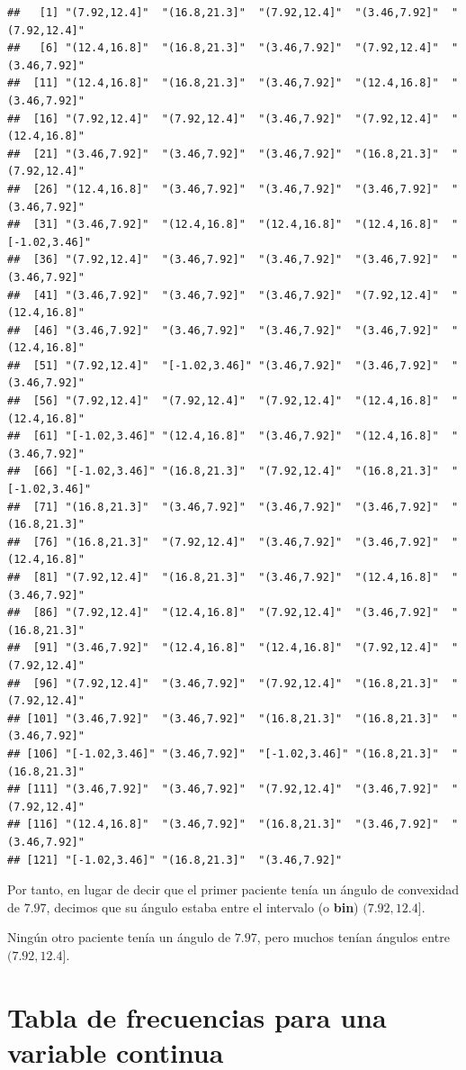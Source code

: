 \documentclass[
]{book}
\begin{document}
\begin{verbatim}
##   [1] "(7.92,12.4]"  "(16.8,21.3]"  "(7.92,12.4]"  "(3.46,7.92]"  "(7.92,12.4]" 
##   [6] "(12.4,16.8]"  "(16.8,21.3]"  "(3.46,7.92]"  "(7.92,12.4]"  "(3.46,7.92]" 
##  [11] "(12.4,16.8]"  "(16.8,21.3]"  "(3.46,7.92]"  "(12.4,16.8]"  "(3.46,7.92]" 
##  [16] "(7.92,12.4]"  "(7.92,12.4]"  "(3.46,7.92]"  "(7.92,12.4]"  "(12.4,16.8]" 
##  [21] "(3.46,7.92]"  "(3.46,7.92]"  "(3.46,7.92]"  "(16.8,21.3]"  "(7.92,12.4]" 
##  [26] "(12.4,16.8]"  "(3.46,7.92]"  "(3.46,7.92]"  "(3.46,7.92]"  "(3.46,7.92]" 
##  [31] "(3.46,7.92]"  "(12.4,16.8]"  "(12.4,16.8]"  "(12.4,16.8]"  "[-1.02,3.46]"
##  [36] "(7.92,12.4]"  "(3.46,7.92]"  "(3.46,7.92]"  "(3.46,7.92]"  "(3.46,7.92]" 
##  [41] "(3.46,7.92]"  "(3.46,7.92]"  "(3.46,7.92]"  "(7.92,12.4]"  "(12.4,16.8]" 
##  [46] "(3.46,7.92]"  "(3.46,7.92]"  "(3.46,7.92]"  "(3.46,7.92]"  "(12.4,16.8]" 
##  [51] "(7.92,12.4]"  "[-1.02,3.46]" "(3.46,7.92]"  "(3.46,7.92]"  "(3.46,7.92]" 
##  [56] "(7.92,12.4]"  "(7.92,12.4]"  "(7.92,12.4]"  "(12.4,16.8]"  "(12.4,16.8]" 
##  [61] "[-1.02,3.46]" "(12.4,16.8]"  "(3.46,7.92]"  "(12.4,16.8]"  "(3.46,7.92]" 
##  [66] "[-1.02,3.46]" "(16.8,21.3]"  "(7.92,12.4]"  "(16.8,21.3]"  "[-1.02,3.46]"
##  [71] "(16.8,21.3]"  "(3.46,7.92]"  "(3.46,7.92]"  "(3.46,7.92]"  "(16.8,21.3]" 
##  [76] "(16.8,21.3]"  "(7.92,12.4]"  "(3.46,7.92]"  "(3.46,7.92]"  "(12.4,16.8]" 
##  [81] "(7.92,12.4]"  "(16.8,21.3]"  "(3.46,7.92]"  "(12.4,16.8]"  "(3.46,7.92]" 
##  [86] "(7.92,12.4]"  "(12.4,16.8]"  "(7.92,12.4]"  "(3.46,7.92]"  "(16.8,21.3]" 
##  [91] "(3.46,7.92]"  "(12.4,16.8]"  "(12.4,16.8]"  "(7.92,12.4]"  "(7.92,12.4]" 
##  [96] "(7.92,12.4]"  "(3.46,7.92]"  "(7.92,12.4]"  "(16.8,21.3]"  "(7.92,12.4]" 
## [101] "(3.46,7.92]"  "(3.46,7.92]"  "(16.8,21.3]"  "(16.8,21.3]"  "(3.46,7.92]" 
## [106] "[-1.02,3.46]" "(3.46,7.92]"  "[-1.02,3.46]" "(16.8,21.3]"  "(16.8,21.3]" 
## [111] "(3.46,7.92]"  "(3.46,7.92]"  "(7.92,12.4]"  "(3.46,7.92]"  "(7.92,12.4]" 
## [116] "(12.4,16.8]"  "(3.46,7.92]"  "(16.8,21.3]"  "(3.46,7.92]"  "(3.46,7.92]" 
## [121] "[-1.02,3.46]" "(16.8,21.3]"  "(3.46,7.92]"
\end{verbatim}

Por tanto, en lugar de decir que el primer paciente tenía un ángulo de convexidad de \(7.97\), decimos que su ángulo estaba entre el intervalo (o \textbf{bin}) \((7.92,12.4]\).

Ningún otro paciente tenía un ángulo de \(7.97\), pero muchos tenían ángulos entre \((7.92,12.4]\).

\hypertarget{tabla-de-frecuencias-para-una-variable-continua}{%
\section{Tabla de frecuencias para una variable continua}\label{tabla-de-frecuencias-para-una-variable-continua}}
\end{document}
